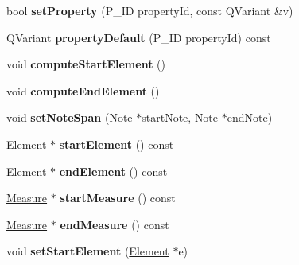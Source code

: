 \begin{DoxyCompactItemize}
bool {\bfseries set\+Property} (P\+\_\+\+ID property\+Id, const Q\+Variant \&v)
\item 
\mbox{\label{class_ms_1_1_spanner_a649525e560f997a70811df1e07756cc6}} 
Q\+Variant {\bfseries property\+Default} (P\+\_\+\+ID property\+Id) const
\item 
\mbox{\label{class_ms_1_1_spanner_ae142fe51440f8deeec1e5a4844042714}} 
void {\bfseries compute\+Start\+Element} ()
\item 
\mbox{\label{class_ms_1_1_spanner_a5fc082bf786fe24117dc3bdce289a7fe}} 
void {\bfseries compute\+End\+Element} ()
\item 
\mbox{\label{class_ms_1_1_spanner_a5cadb075d60a341d0e14cdc5ea577de4}} 
void {\bfseries set\+Note\+Span} (\hyperlink{class_ms_1_1_note}{Note} $\ast$start\+Note, \hyperlink{class_ms_1_1_note}{Note} $\ast$end\+Note)
\item 
\mbox{\label{class_ms_1_1_spanner_a664e7111acb5a8345be95707e2be283f}} 
\hyperlink{class_ms_1_1_element}{Element} $\ast$ {\bfseries start\+Element} () const
\item 
\mbox{\label{class_ms_1_1_spanner_aa8d0b7cc97ab830771fe49c88cb79932}} 
\hyperlink{class_ms_1_1_element}{Element} $\ast$ {\bfseries end\+Element} () const
\item 
\mbox{\label{class_ms_1_1_spanner_ada3466a6eb60c98bbb15f9ec87eecc53}} 
\hyperlink{class_ms_1_1_measure}{Measure} $\ast$ {\bfseries start\+Measure} () const
\item 
\mbox{\label{class_ms_1_1_spanner_a0b9ba614268f1fde951a344992a3146a}} 
\hyperlink{class_ms_1_1_measure}{Measure} $\ast$ {\bfseries end\+Measure} () const
\item 
\mbox{\label{class_ms_1_1_spanner_a6b9d4c455c837a6dc2c3c2f1540ff22d}} 
void {\bfseries set\+Start\+Element} (\hyperlink{class_ms_1_1_element}{Element} $\ast$e)
\item 
\mbox{\label{class_ms_1_1_spanner_aa4950556dbbb619fae97f981251108e0}} 

\end{DoxyCompactItemize}
